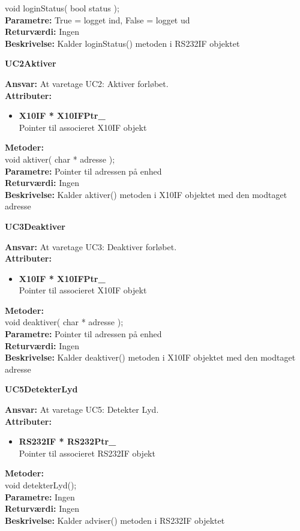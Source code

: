 void loginStatus( bool status ); \\
\textbf{Parametre:} True = logget ind, False = logget ud \\
\textbf{Returværdi:} Ingen \\
\textbf{Beskrivelse:} Kalder loginStatus() metoden i RS232IF objektet \\

%
%
{\centering
\textbf{UC2Aktiver}\par
}
\textbf{Ansvar:} At varetage UC2: Aktiver forløbet. \\
\textbf{Attributer:}
\begin{itemize}
	\item \textbf{X10IF * X10IFPtr\_} \\
	Pointer til associeret X10IF objekt
\end{itemize}
\textbf{Metoder:} \\
void aktiver( char * adresse ); \\
\textbf{Parametre:} Pointer til adressen på enhed \\
\textbf{Returværdi:} Ingen \\
\textbf{Beskrivelse:} Kalder aktiver() metoden i X10IF objektet med den modtaget adresse \\

%
%
{\centering
\textbf{UC3Deaktiver}\par
}
\textbf{Ansvar:} At varetage UC3: Deaktiver forløbet. \\
\textbf{Attributer:}
\begin{itemize}
	\item \textbf{X10IF * X10IFPtr\_} \\
	Pointer til associeret X10IF objekt
\end{itemize}
\textbf{Metoder:} \\
void deaktiver( char * adresse ); \\
\textbf{Parametre:} Pointer til adressen på enhed \\
\textbf{Returværdi:} Ingen \\
\textbf{Beskrivelse:} Kalder deaktiver() metoden i X10IF objektet med den modtaget adresse \\

%
%
{\centering
\textbf{UC5DetekterLyd}\par
}
\textbf{Ansvar:} At varetage UC5: Detekter Lyd. \\
\textbf{Attributer:}
\begin{itemize}
	\item \textbf{RS232IF * RS232Ptr\_} \\
	Pointer til associeret RS232IF objekt
\end{itemize}
\textbf{Metoder:} \\
void detekterLyd(); \\
\textbf{Parametre:} Ingen \\
\textbf{Returværdi:} Ingen \\
\textbf{Beskrivelse:} Kalder adviser() metoden i RS232IF objektet \\

